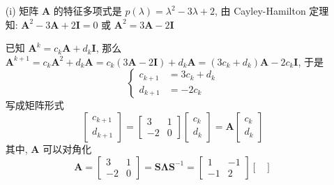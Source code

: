 \documentclass[a4paper, 12pt, UTF8]{ctexart}
\begin{document}
{\color{GoogleRed}
  \begin{solution}
      \begin{itemize}
          \item[(i)]
          矩阵 $\boldsymbol{A}$ 的特征多项式是
          $p(\lambda) = \lambda^{2} - 3\lambda +
          2$, 由 Cayley-Hamilton 定理知:
          $\boldsymbol{A}^{2} - 3\boldsymbol{A} + 2\boldsymbol{I} = 0$ 或 $\boldsymbol{A}^{2} = 3\boldsymbol{A} -
          2\boldsymbol{I}$

          已知
          $\boldsymbol{A}^{k} = c_{k}\boldsymbol{A} +
          d_{k}\boldsymbol{I}$, 那么
          $\boldsymbol{A}^{k+1} = c_{k}\boldsymbol{A}^{2} +
          d_{k}\boldsymbol{A} = c_{k}(3\boldsymbol{A} -
          2\boldsymbol{I}) + d_{k}\boldsymbol{A} = (3c_{k} +
          d_{k})\boldsymbol{A} - 2c_{k}\boldsymbol{I}$, 于是
          \[
              \begin{cases}
                  c_{k+1} &= 3c_{k} + d_{k} \\[3pt]
                  d_{k+1} &= -2c_{k}
              \end{cases}
          \]
          写成矩阵形式
          \[
              \begin{bmatrix}
                  c_{k+1}\\d_{k+1}
              \end{bmatrix} =
              \begin{bmatrix}
                  3 & 1 \\ -2 & 0
              \end{bmatrix}
              \begin{bmatrix}
                  c_{k} \\ d_{k}
              \end{bmatrix} = \boldsymbol{A}
              \begin{bmatrix}
                  c_{k} \\ d_{k}
              \end{bmatrix}
          \]
          其中, $\boldsymbol{A}$ 可以对角化
          \[
              \boldsymbol{A} = \begin{bmatrix} 3 & 1 \\ -2 & 0
              \end{bmatrix} = \boldsymbol{S\Lambda S}^{-1} =
              \begin{bmatrix}
                  1 & -1 \\ -1 & 2
              \end{bmatrix}
              \begin{bmatrix}

\end{bmatrix}\]
\end{itemize}
\end{solution}}
\end{document}
